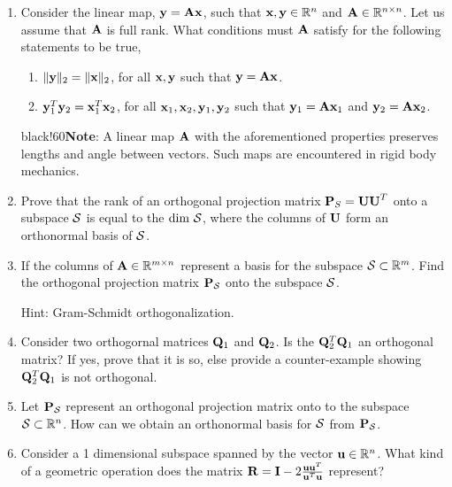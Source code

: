 \begin{enumerate}[resume]
    \item Consider the linear map, $\mathbf{y} = \mathbf{Ax}$, such that $\mathbf{x}, \mathbf{y} \in \mathbb{R}^n$ and $\mathbf{A} \in \mathbb{R}^{n \times n}$. Let us assume that $\mathbf{A}$ is full rank. What conditions must $\mathbf{A}$ satisfy for the following statements to be true,
    \begin{enumerate}
        \item $\Vert \mathbf{y} \Vert_2 = \Vert \mathbf{x} \Vert_2$, for all $\mathbf{x}, \mathbf{y}$ such that $\mathbf{y} = \mathbf{Ax}$.
        \item $\mathbf{y}_1^T\mathbf{y}_2 = \mathbf{x}_1^T\mathbf{x}_2$, for all $\mathbf{x}_1, \mathbf{x}_2, \mathbf{y}_1, \mathbf{y}_2$ such that $\mathbf{y}_1 = \mathbf{A}\mathbf{x}_1$ and $\mathbf{y}_2 = \mathbf{A}\mathbf{x}_2$. 
    \end{enumerate}
    \vspace{-0.1cm}
    \begin{color}{black!60}\small{\textbf{Note}: A linear map $\mathbf{A}$ with the aforementioned properties preserves lengths and angle between vectors. Such maps are encountered in rigid body mechanics.}
    \end{color}

    \item Prove that the rank of an orthogonal projection matrix $\mathbf{P}_{S} = \mathbf{UU}^T$ onto a subspace $\mathcal{S}$ is equal to the $\text{dim } \mathcal{S}$, where the columns of $\mathbf{U}$ form an orthonormal basis of $\mathcal{S}$.

    \item If the columns of $\mathbf{A} \in \mathbb{R}^{m \times n}$ represent a basis for the subspace $\mathcal{S} \subset \mathbb{R}^m$. Find the orthogonal projection matrix $\mathbf{P}_\mathcal{S}$ onto the subspace $\mathcal{S}$.
    
    {\color{gray} Hint: Gram-Schmidt orthogonalization.}

    \item Consider two orthogornal matrices $\mathbf{Q}_1$ and $\mathbf{Q}_2$. Is the $\mathbf{Q}_2^T\mathbf{Q}_1$ an orthogonal matrix? If yes, prove that it is so, else provide a counter-example showing $\mathbf{Q}_2^T\mathbf{Q}_1$ is not orthogonal.

    \item Let $\mathbf{P}_\mathcal{S}$ represent an orthogonal projection matrix onto to the subspace $\mathcal{S} \subset \mathbb{R}^n$. How can we obtain an orthonormal basis for $\mathcal{S}$ from $\mathbf{P}_\mathcal{S}$.

    \item Consider a 1 dimensional subspace spanned by the vector $\mathbf{u} \in \mathbb{R}^n$. What kind of a geometric operation does the matrix $\mathbf{R} = \mathbf{I} - 2\frac{\mathbf{u}\mathbf{u}^T}{\mathbf{u}^T\mathbf{u}}$ represent?
    

\end{enumerate}

